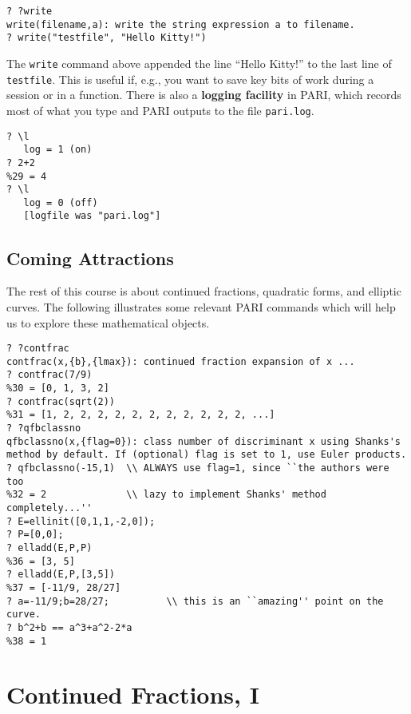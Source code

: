 \documentclass[11pt]{report}
\begin{document}
\begin{verbatim}
? ?write
write(filename,a): write the string expression a to filename.
? write("testfile", "Hello Kitty!")
\end{verbatim}
The {\tt write} command above appended the
line ``Hello Kitty!'' to the last line of {\tt testfile}.
This is useful if, e.g., you want to save key bits of work during
a session or in a function.   There is also a {\bf logging facility}
in PARI, which records most of what you type and PARI outputs to
the file {\tt pari.log}.
\begin{verbatim}
? \l
   log = 1 (on)
? 2+2
%29 = 4
? \l
   log = 0 (off)
   [logfile was "pari.log"]
\end{verbatim}

\section{Coming Attractions}
The rest of this course is about continued fractions,
quadratic forms, and elliptic curves.  The following
illustrates some relevant PARI commands which will
help us to explore these mathematical objects.

\begin{verbatim}
? ?contfrac
contfrac(x,{b},{lmax}): continued fraction expansion of x ...
? contfrac(7/9)
%30 = [0, 1, 3, 2]
? contfrac(sqrt(2))
%31 = [1, 2, 2, 2, 2, 2, 2, 2, 2, 2, 2, 2, ...]
? ?qfbclassno
qfbclassno(x,{flag=0}): class number of discriminant x using Shanks's 
method by default. If (optional) flag is set to 1, use Euler products.
? qfbclassno(-15,1)  \\ ALWAYS use flag=1, since ``the authors were too
%32 = 2              \\ lazy to implement Shanks' method completely...''
? E=ellinit([0,1,1,-2,0]);
? P=[0,0];
? elladd(E,P,P)
%36 = [3, 5]
? elladd(E,P,[3,5])
%37 = [-11/9, 28/27]
? a=-11/9;b=28/27;          \\ this is an ``amazing'' point on the curve.
? b^2+b == a^3+a^2-2*a 
%38 = 1                  
\end{verbatim}








\chapter{Continued Fractions, I}
\end{document}
